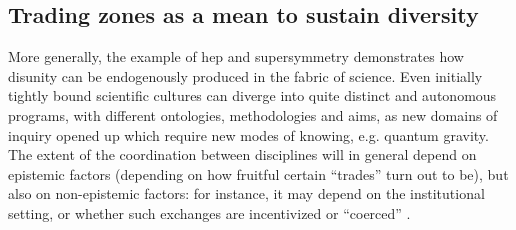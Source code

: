 \documentclass[smallextended]{svjour3}
\begin{document}
\subsection{Trading zones as a mean to sustain diversity}

More generally, the example of \gls{hep} and supersymmetry demonstrates how disunity can be endogenously produced in the fabric of science. Even initially tightly bound scientific cultures can diverge into quite distinct and autonomous programs, with different ontologies, methodologies and aims, as new domains of inquiry opened up which require new modes of knowing, e.g. quantum gravity. The extent of the coordination between disciplines will in general depend on epistemic factors (depending on how fruitful certain ``trades'' turn out to be), but also on non-epistemic factors: for instance, it may depend on the institutional setting, or whether such exchanges are incentivized or ``coerced'' \citep{Collins2010}.
\end{document}
